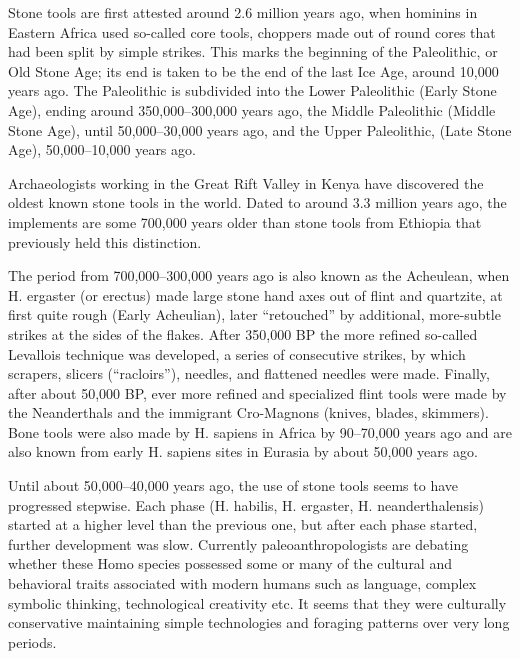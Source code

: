 Stone tools are first attested around 2.6 million years ago, when hominins in Eastern Africa used so-called core tools, choppers made out of round cores that had been split by simple strikes. This marks the beginning of the Paleolithic, or Old Stone Age; its end is taken to be the end of the last Ice Age, around 10,000 years ago. The Paleolithic is subdivided into the Lower Paleolithic (Early Stone Age), ending around 350,000--300,000 years ago, the Middle Paleolithic (Middle Stone Age), until 50,000--30,000 years ago, and the Upper Paleolithic, (Late Stone Age), 50,000--10,000 years ago.

Archaeologists working in the Great Rift Valley in Kenya have discovered the oldest known stone tools in the world. Dated to around 3.3 million years ago, the implements are some 700,000 years older than stone tools from Ethiopia that previously held this distinction.

The period from 700,000--300,000 years ago is also known as the Acheulean, when H. ergaster (or erectus) made large stone hand axes out of flint and quartzite, at first quite rough (Early Acheulian), later ``retouched'' by additional, more-subtle strikes at the sides of the flakes. After 350,000 BP the more refined so-called Levallois technique was developed, a series of consecutive strikes, by which scrapers, slicers (``racloirs''), needles, and flattened needles were made. Finally, after about 50,000 BP, ever more refined and specialized flint tools were made by the Neanderthals and the immigrant Cro-Magnons (knives, blades, skimmers). Bone tools were also made by H. sapiens in Africa by 90--70,000 years ago and are also known from early H. sapiens sites in Eurasia by about 50,000 years ago.

Until about 50,000--40,000 years ago, the use of stone tools seems to have progressed stepwise. Each phase (H. habilis, H. ergaster, H. neanderthalensis) started at a higher level than the previous one, but after each phase started, further development was slow. Currently paleoanthropologists are debating whether these Homo species possessed some or many of the cultural and behavioral traits associated with modern humans such as language, complex symbolic thinking, technological creativity etc. It seems that they were culturally conservative maintaining simple technologies and foraging patterns over very long periods.

